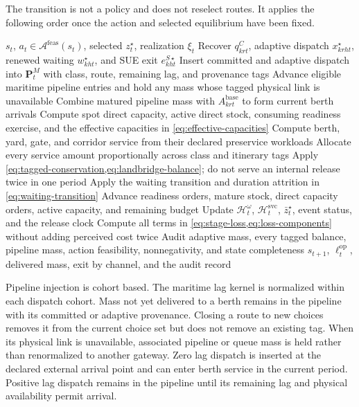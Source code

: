 \documentclass[a4paper,fleqn]{cas-sc}
\begin{document}
The transition is not a policy and does not reselect routes. It applies the
following order once the action and selected equilibrium have been fixed.

\begin{algorithm}[t]
\caption{Model consistent tagged transition and period audit}
\label{alg:tagged-transition}
\begin{algorithmic}[1]
\Require $s_t$, $a_t\in\mathcal A^{\mathrm{feas}}(s_t)$, selected $z_t^\star$, realization $\xi_t$
\State Recover $q^C_{krt}$, adaptive dispatch $x^\star_{krht}$, renewed waiting $w^\star_{kht}$, and SUE exit $e^{S\star}_{kht}$
\State Insert committed and adaptive dispatch into $\mathbf P_t^M$ with class, route, remaining lag, and provenance tags
\State Advance eligible maritime pipeline entries and hold any mass whose tagged physical link is unavailable
\State Combine matured pipeline mass with $A^{\mathrm{base}}_{krt}$ to form current berth arrivals
\State Compute spot direct capacity, active direct stock, consuming readiness exercise, and the effective capacities in \cref{eq:effective-capacities}
\State Compute berth, yard, gate, and corridor service from their declared preservice workloads
\State Allocate every service amount proportionally across class and itinerary tags
\State Apply \cref{eq:tagged-conservation,eq:landbridge-balance}; do not serve an internal release twice in one period
\State Apply the waiting transition and duration attrition in \cref{eq:waiting-transition}
\State Advance readiness orders, mature stock, direct capacity orders, active capacity, and remaining budget
\State Update $\mathcal H_t^\omega$, $\mathcal H_t^{\mathrm{svc}}$, $\bar z_t^\star$, event status, and the release clock
\State Compute all terms in \cref{eq:stage-loss,eq:loss-components} without adding perceived cost twice
\State Audit adaptive mass, every tagged balance, pipeline mass, action feasibility, nonnegativity, and state completeness
\State \Return $s_{t+1}$, $\ell_t^{\mathrm{op}}$, delivered mass, exit by channel, and the audit record
\end{algorithmic}
\end{algorithm}

Pipeline injection is cohort based. The maritime lag kernel is normalized
within each dispatch cohort. Mass not yet delivered to a berth remains in the
pipeline with its committed or adaptive provenance. Closing a route to new
choices removes it from the current choice set but does not remove an existing
tag. When its physical link is unavailable, associated pipeline or queue mass
is held rather than renormalized to another gateway.
Zero lag dispatch is inserted at the declared external arrival point and can
enter berth service in the current period. Positive lag dispatch remains in
the pipeline until its remaining lag and physical availability permit arrival.
\end{document}
